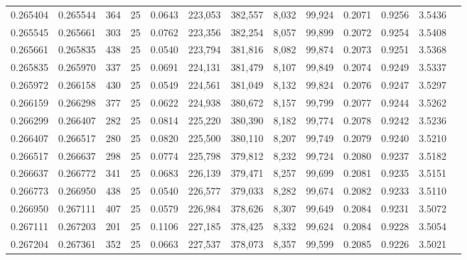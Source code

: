 \begin{tabular}{rrrrrrrrrrrrr}
0.265404 & 0.265544 &   364 &  25 &                                     0.0643 & 223,053 & 382,557 &   8,032 &  99,924 & 0.2071 & 0.9256 & 3.5436 \\
0.265545 & 0.265661 &   303 &  25 &                                     0.0762 & 223,356 & 382,254 &   8,057 &  99,899 & 0.2072 & 0.9254 & 3.5408 \\
0.265661 & 0.265835 &   438 &  25 &                                     0.0540 & 223,794 & 381,816 &   8,082 &  99,874 & 0.2073 & 0.9251 & 3.5368 \\
0.265835 & 0.265970 &   337 &  25 &                                     0.0691 & 224,131 & 381,479 &   8,107 &  99,849 & 0.2074 & 0.9249 & 3.5337 \\
0.265972 & 0.266158 &   430 &  25 &                                     0.0549 & 224,561 & 381,049 &   8,132 &  99,824 & 0.2076 & 0.9247 & 3.5297 \\
0.266159 & 0.266298 &   377 &  25 &                                     0.0622 & 224,938 & 380,672 &   8,157 &  99,799 & 0.2077 & 0.9244 & 3.5262 \\
0.266299 & 0.266407 &   282 &  25 &                                     0.0814 & 225,220 & 380,390 &   8,182 &  99,774 & 0.2078 & 0.9242 & 3.5236 \\
0.266407 & 0.266517 &   280 &  25 &                                     0.0820 & 225,500 & 380,110 &   8,207 &  99,749 & 0.2079 & 0.9240 & 3.5210 \\
0.266517 & 0.266637 &   298 &  25 &                                     0.0774 & 225,798 & 379,812 &   8,232 &  99,724 & 0.2080 & 0.9237 & 3.5182 \\
0.266637 & 0.266772 &   341 &  25 &                                     0.0683 & 226,139 & 379,471 &   8,257 &  99,699 & 0.2081 & 0.9235 & 3.5151 \\
0.266773 & 0.266950 &   438 &  25 &                                     0.0540 & 226,577 & 379,033 &   8,282 &  99,674 & 0.2082 & 0.9233 & 3.5110 \\
0.266950 & 0.267111 &   407 &  25 &                                     0.0579 & 226,984 & 378,626 &   8,307 &  99,649 & 0.2084 & 0.9231 & 3.5072 \\
0.267111 & 0.267203 &   201 &  25 &                                     0.1106 & 227,185 & 378,425 &   8,332 &  99,624 & 0.2084 & 0.9228 & 3.5054 \\
0.267204 & 0.267361 &   352 &  25 &                                     0.0663 & 227,537 & 378,073 &   8,357 &  99,599 & 0.2085 & 0.9226 & 3.5021 \\

\end{tabular}
